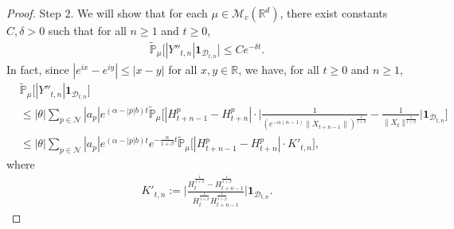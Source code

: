 \documentclass[12pt,a4paper]{amsart}
\theoremstyle{plain}
\theoremstyle{definition}
\numberwithin{equation}{section}
\begin{document}
\begin{proof}
    Step 2. We will show that for each $\mu \in \mathcal{M}_c(\mathbb{R}^d)$, there exist constants $C,\delta > 0$ such that for all $n\geq 1$ and $t\geq 0$,
\begin{align}
\label{thm12211}
    \mathbb{\tilde{P}}_{\mu}\big[|Y''_{t,n}|\mathbf{1}_{\mathcal{D}_{t,n}}\big]\leq Ce^{-\delta t}.
\end{align}
    In fact, since $|e^{ix}-e^{iy}|\leq|x-y|$ for all $x,y\in \mathbb R$, we have, for all $t \geq 0$ and $n\geq 1$,
\begin{align}\label{large: used next}
    &\tilde{\mathbb{P}}_{\mu}\big[|Y''_{t,n}|\mathbf{1}_{\mathcal{D}_{t,n}}\big]\\
    &\leq |\theta|\sum_{p\in\mathcal{N}}|a_p|e^{(\alpha-|p|b)t}\tilde{\mathbb{P}}_{\mu}\Big[|H_{t+n-1}^p-H_{t+n}^p|\cdot\Big|\frac{1}{(e^{-\alpha(n-1)}\|X_{t+n-1}\|)^{\frac{1}{1+\beta}}}-\frac{1}{\|X_t\|^{\frac{1}{1+\beta}}}\Big|\mathbf{1}_{\mathcal{D}_{t,n}}\Big]\\
    &\leq |\theta|\sum_{p\in\mathcal{N}}|a_p|e^{(\alpha-|p|b)t}e^{-\frac{\alpha}{1+\beta}t}\tilde{\mathbb{P}}_{\mu}\Big[|H_{t+n-1}^p-H_{t+n}^p|\cdot K'_{t,n}\Big],
\end{align}
    where
\begin{align}
    K'_{t,n}
    :=\Big|\frac{H_t^{\frac{1}{1+\beta}}-H_{t+n-1}^{\frac{1}{1+\beta}}}{H_t^{\frac{1}{1+\beta}}H_{t+n-1}^{\frac{1}{1+\beta}}}\Big|\mathbf{1}_{\mathcal{D}_{t,n}}.
\end{align}
\begin{comment}

     Note that, since $\eta_1 < \eta_0$, we have
\begin{align*}
    H_{t+n-1}
    &\geq H_{t}- e^{-\eta_0 t}
    \geq 2e^{-\eta_1t}-e^{-\eta_0 t}
    \\&\geq e^{-\eta_1 t},
    \quad \text{ on } \mathcal D_{t,n}.
\end{align*}
    Therefore, for each $t \geq 0$ and $n\geq 1$,
\begin{align*}
     &\Big|H_t^{\frac{1}{1+\beta}}-H_{t+n-1}^{\frac{1}{1+\beta}}\Big|
     \leq \frac{1}{1+\beta}\max \Big\{H_t^{-\frac{\beta}{1+\beta}},H_{t+n-1}^{-\frac{\beta}{1+\beta}}\Big\}\left|H_t-H_{t+n-1}\right|,
    \\&\leq \frac{1}{1+\beta} \max\{e^{\eta_1 t}, \frac{1}{2}e^{\eta_1 t}\}^{\frac{\beta}{1+\beta}}e^{-\eta_0 t}
    \\&\leq \frac{1}{1+\beta} e^{\eta_1 t} e^{-\eta_0 t}
    =\frac{1}{1+\beta}  e^{-(\eta_0 - \eta_1) t},
    \quad \text{ on } \mathcal D_{t,n},
\end{align*}
    and
\begin{align*}
    |H_t^{\frac{1}{1+\beta}}H_{t+n-1}^{\frac{1}{1+\beta}}|
    \geq 2^{\frac{1}{1+\beta}} e^{-2\eta_1t},
    \quad \text{ on } \mathcal D_{t,n}.
\end{align*}
\end{comment}


\end{proof}
\end{document}

